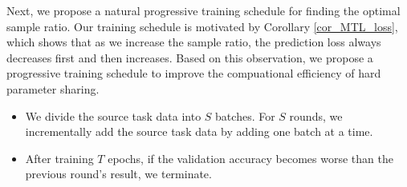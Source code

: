 Next, we propose a natural progressive training schedule for finding the optimal sample ratio.
Our training schedule is motivated by Corollary \ref{cor_MTL_loss}, which shows that as we increase the sample ratio, the prediction loss always decreases first and then increases.
Based on this observation, we propose a progressive training schedule to improve the compuational efficiency of hard parameter sharing.
\begin{itemize}
	\item We divide the source task data into $S$ batches.
	For $S$ rounds, we incrementally add the source task data by adding one batch at a time.
	\item After training $T$ epochs, if the validation accuracy becomes worse than the previous round's result, we terminate.
\end{itemize}


